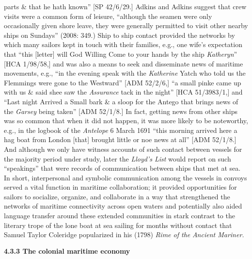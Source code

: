 \begin{styleStandard}
parts \& that he hath known” [SP 42/6/29.] Adkins and Adkins suggest that crew visits were a common form of leisure, “although the seamen were only occasionally given shore leave, they were generally permitted to visit other nearby ships on Sundays” (2008: 349.) Ship to ship contact provided the networks by which many sailors kept in touch with their families, e.g., one wife’s expectation that “this [letter] will God Willing Come to your hands by the ship\textit{ Katheryn}” [HCA 1/98/58,] and was also a means to seek and disseminate news of maritime movements, e.g., “in the evening speak with the \textit{Katherine }Yatch who told us the Flemmings were gone to the Westward” [ADM 52/2/6,] “a small pinke came up with us \& said shee saw the \textit{Assurance} tack in the night” [HCA 51/3983/1,] and “Last night Arrived a Small bark \& a sloop for the Antego that brings news of the \textit{Garsey }being taken” [ADM 52/1/8.] In fact, getting news from other ships was so common that when it did\textit{ }not happen, it was more likely to be noteworthy, e.g., in the logbook of the\textit{ Antelope} 6 March 1691 “this morning arrived here a hag boat from London [that] brought little or noe news at all” [ADM 52/1/8.] And although we only have witness accounts of such contact between vessels for the majority period under study, later the \textit{Lloyd's List} would report on such “speakings” that were records of communication between ships that met at sea. In short, interpersonal and symbolic communication among the vessels in convoys served a vital function in maritime collaboration; it provided opportunities for sailors to socialize, organize, and collaborate in a way that strengthened the networks of maritime connectivity across open waters and potentially also aided language transfer around these extended communities in stark contrast to the literary trope of the lone boat at sea sailing for months without contact that Samuel Taylor Coleridge popularized in his (1798) \textit{Rime of the }\textit{\MakeUppercase{A}}\textit{ncient Mariner. }
\end{styleStandard}

\begin{styleStandard}
\textbf{4.3.3 The colonial maritime economy}
\end{styleStandard}

